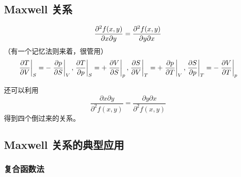 \subsection{Maxwell 关系}

\[
    \pdv{f(x, y)}{x}{y} = \pdv{f(x, y)}{y}{x}
\]（有一个记忆法则来着，很管用）\[
    \left.\pdv{T}{V}\right|_S = - \left.\pdv{p}{S}\right|_V, \left.\pdv{T}{p}\right|_S = + \left.\pdv{V}{S}\right|_p, \left.\pdv{S}{V}\right|_T = + \left.\pdv{p}{T}\right|_V, \left.\pdv{S}{p}\right|_T = - \left.\pdv{V}{T}\right|_p
\]

还可以利用\[
    \frac{\partial x \partial y}{\partial^2 f(x, y)} = \frac{\partial y \partial x}{\partial^2 f(x, y)}
\]得到四个倒过来的关系。

\subsection{Maxwell 关系的典型应用}

\subsubsection{复合函数法}

